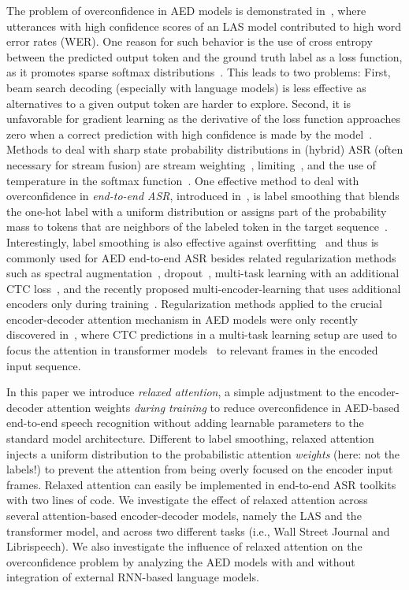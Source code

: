 \documentclass{article}
\begin{document}
The problem of overconfidence in AED models is demonstrated in~\cite{Li2021}, where utterances with high confidence scores of an LAS model contributed to high word error rates (WER). One reason for such behavior is the use of cross entropy between the predicted output token and the ground truth label as a loss function, as it promotes sparse softmax distributions~\cite{pereyra2017}. This leads to two problems: First, beam search decoding (especially with language models) is less effective as alternatives to a given output token are harder to explore. Second, it is unfavorable for gradient learning as the derivative of the loss function approaches zero when a correct prediction with high confidence is made by the model~\cite{Chorowski2017}. Methods to deal with sharp state probability distributions in (hybrid) ASR (often necessary for stream fusion) are stream weighting~\cite{Receveur2016,Abdelaziz2018,Abdelaziz2015}, limiting~\cite{Lohrenz2017}, and the use of temperature in the softmax function~\cite{Hinton2014,Chorowski2017}. One effective method to deal with overconfidence in \textit{end-to-end ASR}, introduced in~\cite{Szegedy2016}, is label smoothing that blends the one-hot label with a uniform distribution or assigns part of the probability mass to tokens that are neighbors of the labeled token in the target sequence~\cite{Chorowski2017}. Interestingly, label smoothing is also effective against overfitting~\cite{Mueller2020} and thus is commonly used for AED end-to-end ASR besides related regularization methods such as spectral augmentation~\cite{Park2019d}, dropout~\cite{Nitish2014}, multi-task learning with an additional CTC loss~\cite{Kim2017,moriya2020}, and the recently proposed multi-encoder-learning that uses additional encoders only during training~\cite{Lohrenz2021}. Regularization methods applied to the crucial encoder-decoder attention mechanism in AED models were only recently discovered in~\cite{Chen2021}, where CTC predictions in a multi-task learning setup are used to focus the attention in transformer models~\cite{Chen2021} to relevant frames in the encoded input sequence.

In this paper we introduce \textit{relaxed attention}, a simple adjustment to the encoder-decoder attention weights \textit{during training} to reduce overconfidence in AED-based end-to-end speech recognition without adding learnable parameters to the standard model architecture. Different to label smoothing, relaxed attention injects a uniform distribution to the probabilistic attention \textit{weights} (here: not the labels!) to prevent the attention from being overly focused on the encoder input frames. Relaxed attention can easily be implemented in end-to-end ASR toolkits with two lines of code. We investigate the effect of relaxed attention across several attention-based encoder-decoder models, namely the LAS and the transformer model, and across two different tasks (i.e., Wall Street Journal and Librispeech). We also investigate the influence of relaxed attention on the overconfidence problem by ana\-lyzing the AED models with and without integration of external RNN-based language models. 
\end{document}
